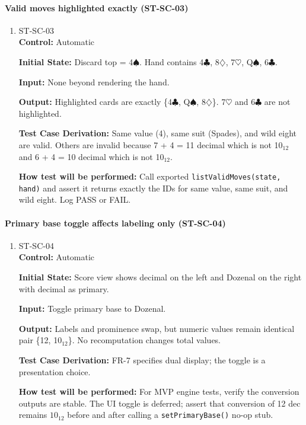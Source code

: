 \documentclass[12pt, titlepage]{article}
\begin{document}
\paragraph{Valid moves highlighted exactly (ST-SC-03)}
\begin{enumerate}
\item{ST-SC-03\\}
\textbf{Control:} Automatic

\textbf{Initial State:} Discard top = 4$\spadesuit$. Hand contains 4$\clubsuit$, 8$\diamondsuit$, 7$\heartsuit$, Q$\spadesuit$, 6$\clubsuit$.

\textbf{Input:} None beyond rendering the hand.

\textbf{Output:} Highlighted cards are exactly \{4$\clubsuit$, Q$\spadesuit$, 8$\diamondsuit$\}. 7$\heartsuit$ and 6$\clubsuit$ are not highlighted.

\textbf{Test Case Derivation:} Same value (4), same suit (Spades), and wild eight are valid. Others are invalid because 7 + 4 = 11 decimal which is not 10$_{12}$ and 6 + 4 = 10 decimal which is not 10$_{12}$.

\textbf{How test will be performed:} Call exported \texttt{listValidMoves(state, hand)} and assert it returns exactly the IDs for same value, same suit, and wild eight. Log PASS or FAIL.
\end{enumerate}

\paragraph{Primary base toggle affects labeling only (ST-SC-04)}
\begin{enumerate}
\item{ST-SC-04\\}
\textbf{Control:} Automatic

\textbf{Initial State:} Score view shows decimal on the left and Dozenal on the right with decimal as primary.

\textbf{Input:} Toggle primary base to Dozenal.

\textbf{Output:} Labels and prominence swap, but numeric values remain identical pair \{12, 10$_{12}$\}. No recomputation changes total values.

\textbf{Test Case Derivation:} FR-7 specifies dual display; the toggle is a presentation choice.

\textbf{How test will be performed:} For MVP engine tests, verify the conversion outputs are stable. The UI toggle is deferred; assert that conversion of 12 dec remains $10_{12}$ before and after calling a \texttt{setPrimaryBase()} no-op stub.
\end{enumerate}
\end{document}
